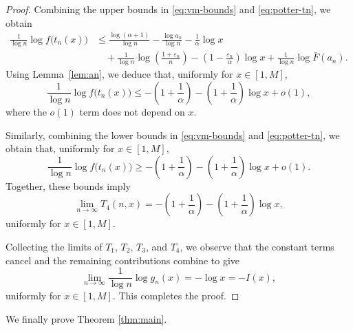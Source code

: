 \documentclass[11pt,reqno]{amsart}
\theoremstyle{definition}
\theoremstyle{remark}
\numberwithin{equation}{section}
\begin{document}
\begin{proof}
Combining the upper bounds in \eqref{eq:vm-bounds} and \eqref{eq:potter-tn}, we
obtain
\begin{align*}
\frac{1}{\log n}\log f\bigl(t_n(x)\bigr)
&\le
\frac{\log(\alpha+1)}{\log n}
-\frac{\log a_n}{\log n}
-\frac{1}{\alpha}\log x \\
&\quad
+\frac{1}{\log n}\log\!\left(\frac{1+\varepsilon_n}{n}\right)
-\left(1-\frac{\varepsilon_n}{\alpha}\right)\log x
+\frac{1}{\log n}\log\bar F(a_n).
\end{align*}
Using Lemma~\ref{lem:an}, we deduce that, uniformly for $x\in[1,M]$,
\[
\frac{1}{\log n}\log f\bigl(t_n(x)\bigr)
\le
-\left(1+\frac{1}{\alpha}\right)
-\left(1+\frac{1}{\alpha}\right)\log x
+o(1),
\]
where the $o(1)$ term does not depend on $x$.

Similarly, combining the lower bounds in \eqref{eq:vm-bounds} and
\eqref{eq:potter-tn}, we obtain that, uniformly for $x\in[1,M]$,
\[
\frac{1}{\log n}\log f\bigl(t_n(x)\bigr)
\ge
-\left(1+\frac{1}{\alpha}\right)
-\left(1+\frac{1}{\alpha}\right)\log x
+o(1).
\]
Together, these bounds imply
\[
\lim_{n\to\infty}T_4(n,x)
=
-\left(1+\frac{1}{\alpha}\right)
-\left(1+\frac{1}{\alpha}\right)\log x,
\]
uniformly for $x\in[1,M]$.

Collecting the limits of $T_1$, $T_2$, $T_3$, and $T_4$, we observe that the
constant terms cancel and the remaining contributions combine to give
\[
\lim_{n\to\infty}\frac{1}{\log n}\log g_n(x)
=
-\log x
=
-I(x),
\]
uniformly for $x\in[1,M]$. This completes the proof.
\end{proof}





We finally prove Theorem \ref{thm:main}.
\end{document}
